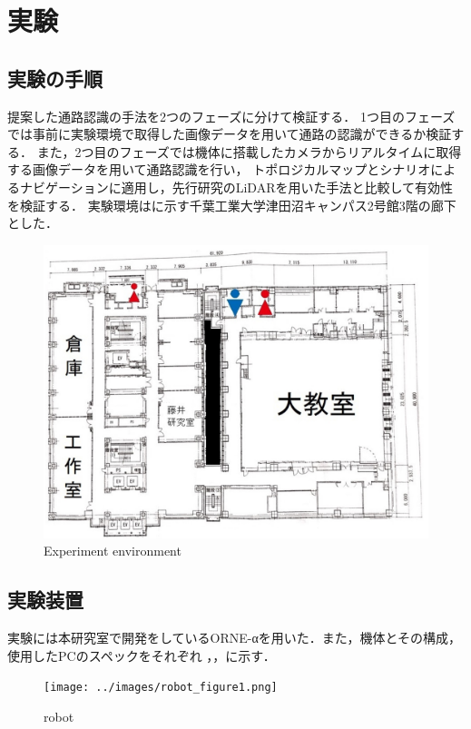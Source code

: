 \documentclass[../main]{subfiles}
\begin{document}
\setcounter{secnumdepth}{3}
    \chapter{実験}
    \section{実験の手順}
        提案した通路認識の手法を2つのフェーズに分けて検証する．
        1つ目のフェーズでは事前に実験環境で取得した画像データを用いて通路の認識ができるか検証する．
        また，2つ目のフェーズでは機体に搭載したカメラからリアルタイムに取得する画像データを用いて通路認識を行い，
        トポロジカルマップとシナリオによるナビゲーションに適用し，先行研究のLiDARを用いた手法と比較して有効性を検証する．
        実験環境はに示す千葉工業大学津田沼キャンパス2号館3階の廊下とした．
        \begin{figure}[H]
         \centering
         \includegraphics{../images/MAP_Tsudanuma2-3.png}
         \caption{Experiment environment}
         \label{figure::3floor_map}
        \end{figure}

    \section{実験装置}
        実験には本研究室で開発をしているORNE-αを用いた．また，機体とその構成，使用したPCのスペックをそれぞれ
        ，，に示す．
        

        \begin{figure}[H]
        \centering
        \texttt{[image: ../images/robot\_figure1.png]}
        \caption{robot}
        \label{figure::robot_image}
        \end{figure}
\end{document}
